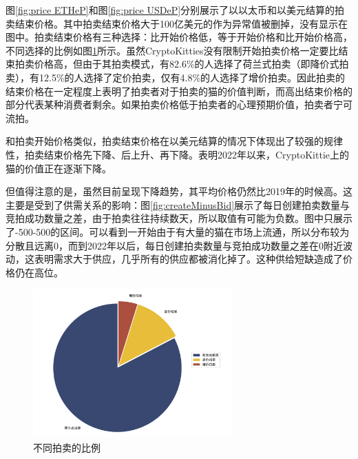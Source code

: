 \documentclass{myreport}
\begin{document}
图\ref{fig:price ETHeP}和图\ref{fig:price USDeP}分别展示了以以太币和以美元结算的拍卖结束价格。其中拍卖结束价格大于100亿美元的作为异常值被删掉，没有显示在图中。拍卖结束价格有三种选择：比开始价格低，等于开始价格和比开始价格高，不同选择的比例如图\ref{fig:bid pie}所示。虽然CryptoKitties没有限制开始拍卖价格一定要比结束拍卖价格高，但由于其拍卖模式，有82.6\%的人选择了荷兰式拍卖（即降价式拍卖），有12.5\%的人选择了定价拍卖，仅有4.8\%的人选择了增价拍卖。因此拍卖的结束价格在一定程度上表明了拍卖者对于拍卖的猫的价值判断，而高出结束价格的部分代表某种消费者剩余。如果拍卖价格低于拍卖者的心理预期价值，拍卖者宁可流拍。

和拍卖开始价格类似，拍卖结束价格在以美元结算的情况下体现出了较强的规律性，拍卖结束价格先下降、后上升、再下降。表明2022年以来，CryptoKittie上的猫的价值正在逐渐下降。

但值得注意的是，虽然目前呈现下降趋势，其平均价格仍然比2019年的时候高。这主要是受到了供需关系的影响：图\ref{fig:createMinusBid}展示了每日创建拍卖数量与竞拍成功数量之差，由于拍卖往往持续数天，所以取值有可能为负数。图中只展示了-500-500的区间。可以看到一开始由于有大量的猫在市场上流通，所以分布较为分散且远离0，而到2022年以后，每日创建拍卖数量与竞拍成功数量之差在0附近波动，这表明需求大于供应，几乎所有的供应都被消化掉了。这种供给短缺造成了价格仍在高位。

\begin{figure}[!htbp]
	\centering
	\includegraphics[width=3in]{figure/bid pie.pdf}
	\caption{不同拍卖的比例}
	\label{fig:bid pie}
\end{figure}
\end{document}
